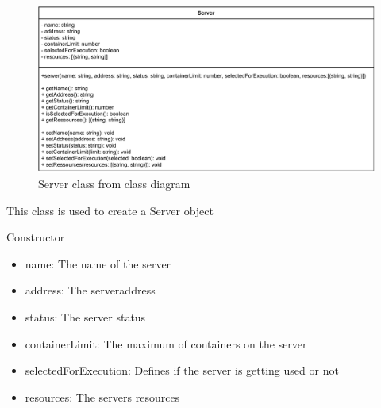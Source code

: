 
\begin{figure}[H]
\centerline{\includegraphics[width=\textwidth]{res/Klassen/ServerClass.pdf}}
\caption{Server class from class diagram}
\end{figure}

This class is used to create a Server object

\begin{methodenv}{Constructor}



\begin{itemize}
	\item{name:}
	The name of the server
	\item{address:}
	The serveraddress
	\item{status:}
	The server status
	\item{containerLimit:}
	The maximum of containers on the server
	\item{selectedForExecution:}
	Defines if the server is getting used or not
	\item{resources:}
	The servers resources
\end{itemize}
\end{methodenv}

\newpage